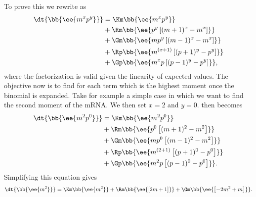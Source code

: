 To prove this we rewrite  as
\begin{equation}
  \begin{aligned}
    \dt{\bb{\ee{m^x p^y}}} &=
    \Km \bb{\ee{m^x p^y}}\\
    &+ \Rm \bb{\ee{p^y \left[ (m + 1)^x -m^x \right]}}\\
    &+ \Gm \bb{\ee{m p^y \left[ (m - 1)^x - m^x \right]}}\\
    &+ \Rp \bb{\ee{m^{(x + 1)} \left[ (p + 1)^y - p^y \right]}}\\
    &+ \Gp \bb{\ee{m^x p \left[ (p - 1)^y - p^y \right]}},
    \label{seq_mom_pde_factorized}
  \end{aligned}
\end{equation}
where the factorization is valid given the linearity of expected values. The
objective now is to find for each term which is the highest moment once the
binomial is expanded. Take for example a simple case in which we want to find
the second moment of the mRNA. We then set $x = 2$ and $y = 0$.
 then becomes
\begin{equation}
  \begin{aligned}
    \dt{\bb{\ee{m^2 p^0}}} &=
    \Km \bb{\ee{m^2 p^0}}\\
    &+ \Rm \bb{\ee{p^0 \left[ (m + 1)^2 - m^2 \right]}}\\
    &+ \Gm \bb{\ee{m p^0 \left[ (m - 1)^2 - m^2 \right]}}\\
    &+ \Rp \bb{\ee{m^{(2 + 1)} \left[ (p + 1)^0 - p^0 \right]}}\\
    &+ \Gp \bb{\ee{m^2 p \left[ (p - 1)^0 - p^0 \right]}}.
  \end{aligned}
\end{equation}
Simplifying this equation gives
\begin{equation}
    \dt{\bb{\ee{m^2}}} =
    \Km \bb{\ee{m^2}}
    + \Rm \bb{\ee{\left[ 2m + 1 \right]}}
    + \Gm \bb{\ee{\left[- 2m^2 + m \right]}}.
    \label{seq_second_mom_mRNA}
\end{equation}

